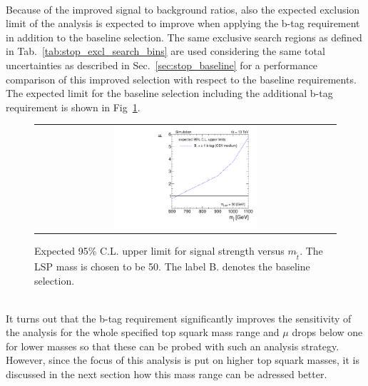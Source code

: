 \\
Because of the improved signal to background ratios, also the expected exclusion limit of the analysis is expected to improve when applying the b-tag requirement in addition to the baseline selection. The same exclusive search regions as defined in Tab.~\ref{tab:stop_excl_search_bins} are used considering the same total uncertainties as described in Sec.~\ref{sec:stop_baseline} for a performance comparison of this improved selection with respect to the baseline requirements. The expected limit for the baseline selection including the additional b-tag requirement is shown in Fig~\ref{fig:stop_baselinebtag_limit}. 
\begin{figure}[!h]
  \centering
  \begin{tabular}{c}
                \includegraphics[width=0.49\textwidth]{figures/limitplot4BinSel_BaselineBTag_LSP50.pdf} 
  \end{tabular}
  \caption{Expected 95\% C.L. upper limit for signal strength versus $m_{\tilde{t}}$. The LSP mass is chosen to be 50\gev. The label B. denotes the baseline selection.}
  \label{fig:stop_baselinebtag_limit}
\end{figure}
\\
It turns out that the b-tag requirement significantly improves the sensitivity of the analysis for the whole specified top squark mass range and $\mu$ drops below one for lower masses so that these can be probed with such an analysis strategy. However, since the focus of this analysis is put on higher top squark masses, it is discussed in the next section how this mass range can be adressed better.  

